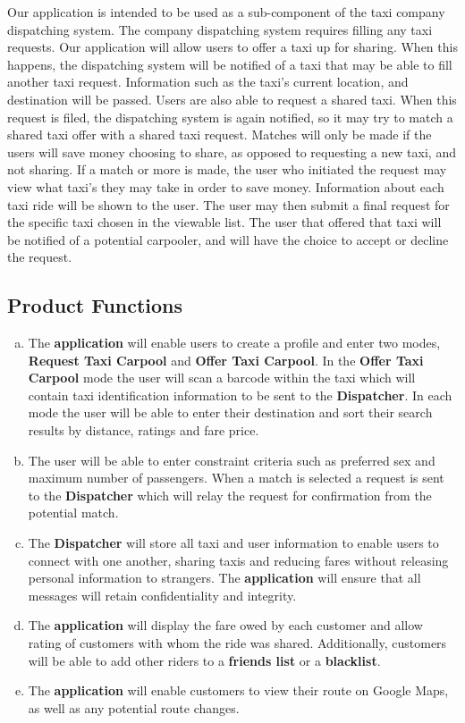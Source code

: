 \documentclass[english]{article}
\begin{document}
Our application is intended to be used as 
a sub-component of the taxi company dispatching system. The company dispatching system requires 
filling any taxi requests. Our application will allow users to offer a taxi up for sharing. 
When this happens, the dispatching system will be notified of a taxi that may be able to fill
another taxi request. Information such as the taxi's current location, and destination will be passed. Users are also able to request a shared taxi. When this request is filed, the dispatching system is again notified, so it may try to match a shared taxi offer with a shared taxi request. Matches will only be made if the users will save money choosing to share, as opposed to 
requesting a new taxi, and not sharing. If a match or more is made, the user who initiated the request may view what taxi's they may take in order to save money. Information about each taxi
ride will be shown to the user. The user may then submit a final request for the specific taxi
chosen in the viewable list. The user that offered that taxi will be notified of a potential
carpooler, and will have the choice to accept or decline the request.

\subsection{Product Functions}
\label{sub:product_functions}
\begin{enumerate}[a)]
\item The \textbf{application} will enable users to create a profile and enter two modes, \textbf{Request Taxi Carpool} and \textbf{Offer Taxi Carpool}. In the \textbf{Offer Taxi Carpool} mode the user will scan a barcode within the taxi which will contain taxi identification information to be sent to the \textbf{Dispatcher}. In each mode the user will be able to enter their destination and sort their search results by distance, ratings and fare price. 
	
	\item The user will be able to enter constraint criteria such as preferred sex and maximum number of passengers. When a match is selected a request is sent to the \textbf{Dispatcher} which will relay the request for confirmation from the potential match. 
	
	\item The \textbf{Dispatcher} will store all taxi and user information to enable users to connect with one another, sharing taxis and reducing fares without releasing personal information to strangers. The \textbf{application} will ensure that all messages will retain confidentiality and integrity.
	
	\item The \textbf{application} will display the fare owed by each customer and allow rating of customers with whom the ride was shared. Additionally, customers will be able to add other riders to a \textbf{friends list} or a \textbf{blacklist}.
	
	\item The \textbf{application} will enable customers to view their route on Google Maps, as well as any potential route changes.
\end{enumerate}
\end{document}
